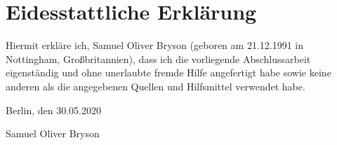 \chapter*{Eidesstattliche Erkl\"arung}

Hiermit erkl\"are ich, Samuel Oliver Bryson (geboren am 21.12.1991 in Nottingham, Gro\ss{}britannien), dass ich die vorliegende Abschlussarbeit eigenst\"andig und ohne unerlaubte fremde Hilfe angefertigt habe sowie keine anderen als die angegebenen Quellen und Hilfsmittel verwendet habe.

\vspace{2cm}

\begin{flushright}
	Berlin, den 30.05.2020 \hspace{1cm} \underline{\hspace{7cm}}

	Samuel Oliver Bryson \hspace{1.5cm} \par
\end{flushright}